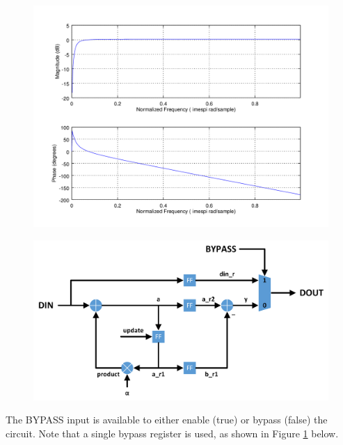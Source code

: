 \documentclass{article}
\begin{document}
\begin{flushleft}
	\begin{figure}[ht]
		\centering
		\begin{minipage}{.5\textwidth}
			\centering\captionsetup{type=figure}\includegraphics[width=1.0\linewidth]{dc_filter}
			\label{fig:ideal}
		\end{minipage}%
		\begin{minipage}{.5\textwidth}
			\centering\captionsetup{type=figure}\includegraphics[width=1.0\linewidth]{dc_offset_circuit}
			\label{fig:circuit}
		\end{minipage}
	\end{figure}
	The BYPASS input is available to either enable (true) or bypass (false) the circuit. Note that a single bypass register is used, as shown in Figure \ref{fig:circuit} below.\medskip
\end{flushleft}
\end{document}
